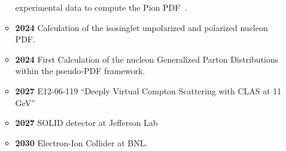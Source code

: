 \documentclass[12pt,hyperpdf]{article}
\begin{document}
\begin{itemize}
\begin{itemize}
     experimental data to compute the Pion PDF~\cite{JeffersonLabAngularMomentumJAM:2022aix}.
   \item{\bf 2024} Calculation of the isosinglet unpolarized and
     polarized nucleon PDF.
   \item{\bf 2024} First Calculation of the nucleon Generalized Parton
     Distributions within the pseudo-PDF framework.
   \item{\bf 2027} E12-06-119 ``Deeply Virtual Compton Scattering with
     CLAS at 11 GeV''
   \item{\bf 2027} SOLID detector at Jefferson Lab
   \item{\bf 2030} Electron-Ion Collider at BNL.
\end{itemize}
\end{itemize}


\end{document}
